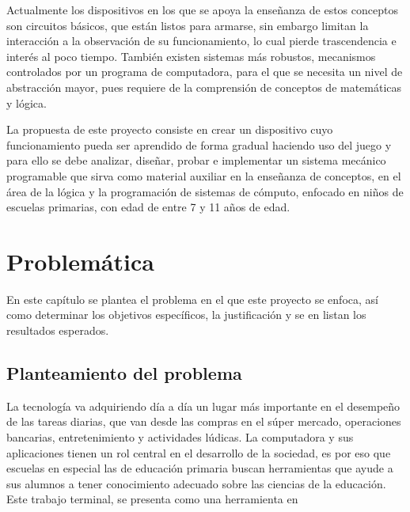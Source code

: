 \documentclass[letterpaper,10pt]{article}
\begin{document}
Actualmente los dispositivos en los que se apoya la enseñanza de estos 
conceptos son circuitos básicos, que están listos para armarse, sin embargo 
limitan la interacción a la observación de su funcionamiento, 
lo cual pierde trascendencia e interés al poco tiempo. También existen 
sistemas más robustos, mecanismos controlados por un programa de computadora, 
para el que se necesita un nivel de abstracción mayor, 
pues requiere de la comprensión de conceptos de matemáticas y lógica.
\newline

La propuesta de este proyecto consiste en crear un dispositivo cuyo 
funcionamiento pueda ser aprendido de forma gradual 
haciendo uso del juego y para ello se debe analizar, 
diseñar, probar e implementar un sistema mecánico programable que sirva como 
material auxiliar en la enseñanza de conceptos, en el área de la lógica
y la programación de sistemas de cómputo, enfocado en niños de escuelas primarias,
con edad de entre 7 y 11 años de edad.
\newpage

\section{Problemática}
En este capítulo se plantea el problema en el que este proyecto se enfoca, así como
determinar los objetivos específicos, la justificación y se en listan los resultados esperados.
\newline

\subsection{Planteamiento del problema}

La tecnología va adquiriendo día a día un lugar más importante en el
desempeño de las tareas diarias, que van desde las compras en el súper mercado,
operaciones bancarias, entretenimiento y actividades lúdicas. La computadora 
y sus aplicaciones tienen un rol central en el desarrollo de la sociedad, 
es por eso que escuelas en especial las de educación primaria
buscan herramientas que ayude a sus alumnos a tener conocimiento adecuado 
sobre las ciencias de la educación.
\newline
Este trabajo terminal, se presenta como una herramienta en
\end{document}
